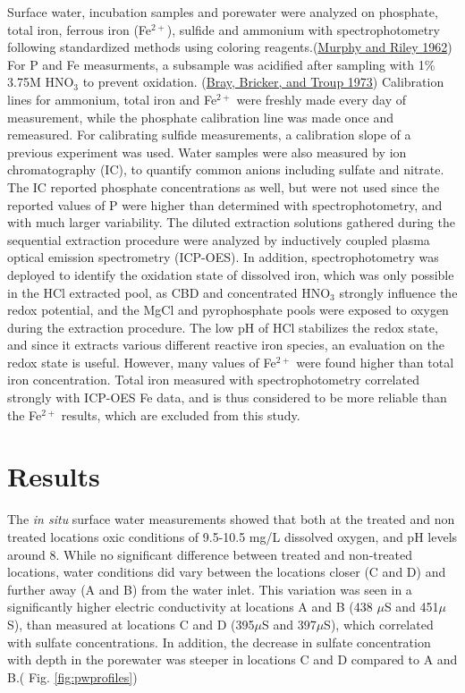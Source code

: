 \documentclass[a4paper,11pt]{article}
\begin{document}
Surface water, incubation samples and porewater were analyzed on phosphate, total iron, ferrous iron (Fe\(^{2+}\)), sulfide and ammonium with spectrophotometry following standardized methods using coloring reagents.(\protect\hyperlink{ref-murphyModifiedSingleSolution1962}{Murphy and Riley 1962}) For P and Fe measurments, a subsample was acidified after sampling with 1\% 3.75M HNO\(_3\) to prevent oxidation. (\protect\hyperlink{ref-brayPhosphateInterstitialWaters1973}{Bray, Bricker, and Troup 1973}) Calibration lines for ammonium, total iron and Fe\(^{2+}\) were freshly made every day of measurement, while the phosphate calibration line was made once and remeasured. For calibrating sulfide measurements, a calibration slope of a previous experiment was used. Water samples were also measured by ion chromatography (IC), to quantify common anions including sulfate and nitrate. The IC reported phosphate concentrations as well, but were not used since the reported values of P were higher than determined with spectrophotometry, and with much larger variability. The diluted extraction solutions gathered during the sequential extraction procedure were analyzed by inductively coupled plasma optical emission spectrometry (ICP-OES). In addition, spectrophotometry was deployed to identify the oxidation state of dissolved iron, which was only possible in the HCl extracted pool, as CBD and concentrated HNO\(_3\) strongly influence the redox potential, and the MgCl and pyrophosphate pools were exposed to oxygen during the extraction procedure. The low pH of HCl stabilizes the redox state, and since it extracts various different reactive iron species, an evaluation on the redox state is useful. However, many values of Fe\(^{2+}\) were found higher than total iron concentration. Total iron measured with spectrophotometry correlated strongly with ICP-OES Fe data, and is thus considered to be more reliable than the Fe\(^{2+}\) results, which are excluded from this study.

\hypertarget{results}{%
\section{Results}\label{results}}

The \textit{in situ} surface water measurements showed that both at the treated and non treated locations oxic conditions of 9.5-10.5 mg/L dissolved oxygen, and pH levels around 8. While no significant difference between treated and non-treated locations, water conditions did vary between the locations closer (C and D) and further away (A and B) from the water inlet. This variation was seen in a significantly higher electric conductivity at locations A and B (438 \(\mu\)S and 451\(\mu\)S), than measured at locations C and D (395\(\mu\)S and 397\(\mu\)S), which correlated with sulfate concentrations. In addition, the decrease in sulfate concentration with depth in the porewater was steeper in locations C and D compared to A and B.( Fig. \ref{fig:pwprofiles})
\end{document}
